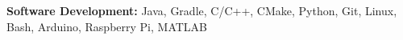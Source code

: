 \textbf{Software Development:} Java, Gradle, C/C++, CMake, Python, Git, Linux, Bash, Arduino, Raspberry Pi, MATLAB
